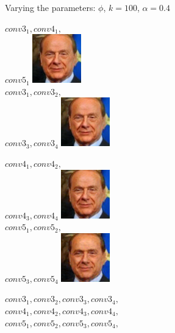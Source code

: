 \documentclass[11pt]{beamer}
\begin{document}
\begin{frame}{Varying the parameters: $\phi$, {\tiny $k=100$, $\alpha=0.4$}}{}
	\centering
	\begin{minipage}{0.3\textwidth}
		\centering
		\scriptsize
		$conv3_1,conv4_1,$\\$conv5_1$
		\includegraphics[width=80px]{../pictures/outputs/layer_comparison/persons/Silvio_Berlusconi_0023/Senior_alpha-0.4_k-2002017-02-08_23-43-37.png}\\
		$conv3_1,conv3_2,$\\$conv3_3,conv3_4$
		\includegraphics[width=80px]{../pictures/outputs/layer_comparison/persons/Silvio_Berlusconi_0023/Senior_alpha-0.4_k-2002017-02-08_23-46-51.png}\\
		
	\end{minipage}%
	\begin{minipage}{0.3\textwidth}
		\scriptsize
		\centering
		$conv4_1,conv4_2,$\\$conv4_3,conv4_4$
		\includegraphics[width=80px]{../pictures/outputs/layer_comparison/persons/Silvio_Berlusconi_0023/Senior_alpha-0.4_k-2002017-02-08_23-48-36.png}\\
		$conv5_1,conv5_2,$\\$conv5_3,conv5_4$
		\includegraphics[width=80px]{../pictures/outputs/layer_comparison/persons/Silvio_Berlusconi_0023/Senior_alpha-0.4_k-2002017-02-08_23-50-32.png}\\
	\end{minipage}%
	\begin{minipage}{0.3\textwidth}
		\centering
		\scriptsize
		$conv3_1,conv3_2,conv3_3,conv3_4,$\\
		$conv4_1,conv4_2,conv4_3,conv4_4,$\\
		$conv5_1,conv5_2,conv5_3,conv5_4,$\\
		

\end{minipage}
\end{frame}
\end{document}
